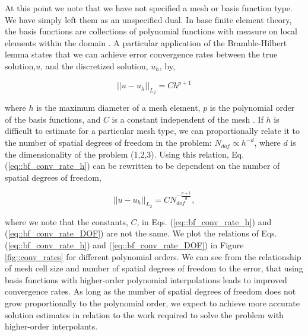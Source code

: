 \documentclass[11pt]{article}
\begin{document}
At this point we note that we have not specified a mesh or basis function type. We have simply left them as an unspecified dual. In base finite element theory, the basis functions are collections of polynomial functions with measure on local elements within the domain \cite{ern2013theory}. A particular application of the Bramble-Hilbert lemma states that we can achieve error convergence rates between the true solution,$u$, and the discretized solution, $u_h$, by,

\begin{equation}
\label{eq::bf_conv_rate_h}
|| u - u_h ||_{L_2} = C h^{p+1}
\end{equation}

\noindent where $h$ is the maximum diameter of a mesh element, $p$ is the polynomial order of the basis functions, and $C$ is a constant independent of the mesh \cite{bramble1970estimation}. If $h$ is difficult to estimate for a particular mesh type, we can proportionally relate it to the number of spatial degrees of freedom in the problem: $N_{dof} \propto h^{-d}$, where $d$ is the dimensionality of the problem (1,2,3). Using this relation, Eq. (\ref{eq::bf_conv_rate_h}) can be rewritten to be dependent on the number of spatial degrees of freedom,

\begin{equation}
\label{eq::bf_conv_rate_DOF}
|| u - u_h ||_{L_2} = C N_{dof}^{- \frac{p+1}{d}},
\end{equation}

\noindent where we note that the constants, $C$, in Eqs. (\ref{eq::bf_conv_rate_h}) and (\ref{eq::bf_conv_rate_DOF}) are not the same. We plot the relations of Eqs. (\ref{eq::bf_conv_rate_h}) and (\ref{eq::bf_conv_rate_DOF}) in Figure \ref{fig::conv_rates} for different polynomial orders. We can see from the relationship of mesh cell size and number of spatial degrees of freedom to the error, that using basis functions with higher-order polynomial interpolations leads to improved convergence rates. As long as the number of spatial degrees of freedom does not grow proportionally to the polynomial order, we expect to achieve more accurate solution estimates in relation to the work required to solve the problem with higher-order interpolants.
\end{document}
